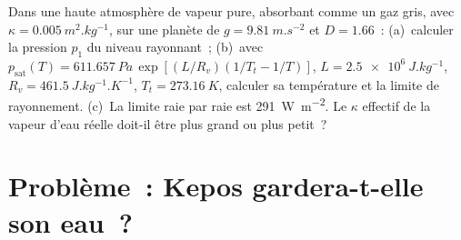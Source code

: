 \begin{exercise}[$\star\star\star$]\label{exo:b3:planetary-atmospheres:12}
Dans une haute atmosphère de vapeur pure, absorbant comme un gaz gris, avec $\kappa =
\qty{0.005}{m^2.kg^{-1}}$, sur une planète de $g = \qty{9.81}{m.s^{-2}}$
et $D = 1.66$~: (a)~calculer la pression $p_1$ du niveau rayonnant~;
(b)~avec $p_\mathrm{sat}(T) = \qty{611.657}{Pa}\,\exp[(L/R_v)(1/T_t -
1/T)]$, $L = \qty{2.5e6}{J.kg^{-1}}$, $R_v = \qty{461.5}{J.kg^{-1}.K^{-1}}$,
$T_t = \qty{273.16}{K}$, calculer sa température et la limite de rayonnement.
(c)~La limite raie par raie est \qty{291}{W.m^{-2}}. Le
$\kappa$ effectif de la vapeur d'eau réelle doit-il être plus grand ou plus petit~?
\end{exercise}

\section{Problème~: Kepos gardera-t-elle son eau~?}

